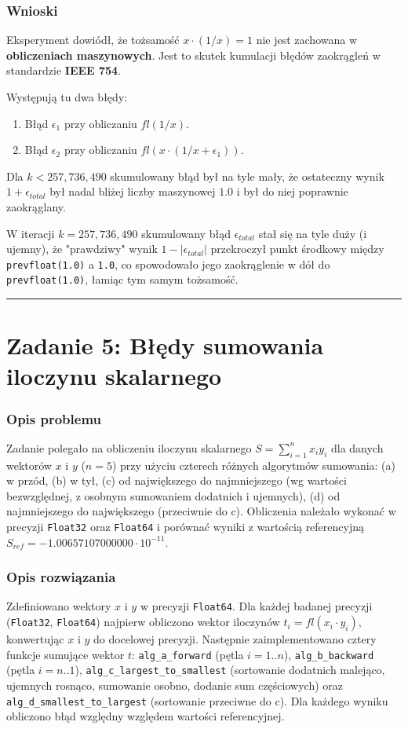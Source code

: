 \documentclass[11pt, a4paper]{article}
\newcommand{\taskseparator}{\leavevmode\leaders\hrule height 0.5pt\hfill\kern0pt}
\begin{document}
\subsubsection{Wnioski}
Eksperyment dowiódł, że tożsamość $x \cdot (1/x) = 1$ nie jest zachowana w \textbf{obliczeniach maszynowych}. Jest to skutek  kumulacji błędów zaokrągleń  w standardzie \textbf{IEEE 754}.

Występują tu dwa błędy:
\begin{enumerate}
    \item Błąd $\epsilon_1$ przy obliczaniu $fl(1/x)$.
    \item Błąd $\epsilon_2$ przy obliczaniu $fl(x \cdot (1/x + \epsilon_1))$.
\end{enumerate}
Dla $k < 257,736,490$ skumulowany błąd był na tyle mały, że ostateczny wynik $1 + \epsilon_{total}$ był nadal bliżej liczby maszynowej $1.0$ i był do niej poprawnie zaokrąglany.

W iteracji $k = 257,736,490$ skumulowany błąd $\epsilon_{total}$ stał się na tyle duży (i ujemny), że "prawdziwy" wynik $1 - |\epsilon_{total}|$ przekroczył punkt środkowy między \texttt{prevfloat(1.0)} a \texttt{1.0}, co spowodowało jego zaokrąglenie w dół do \texttt{prevfloat(1.0)}, łamiąc tym samym tożsamość.

\taskseparator

\section{Zadanie 5: Błędy sumowania iloczynu skalarnego}

\subsubsection{Opis problemu}
Zadanie polegało na obliczeniu iloczynu skalarnego $S = \sum_{i=1}^{n} x_i y_i$ dla danych wektorów $x$ i $y$ ($n=5$) przy użyciu czterech różnych algorytmów sumowania: (a) w przód, (b) w tył, (c) od największego do najmniejszego (wg wartości bezwzględnej, z osobnym sumowaniem dodatnich i ujemnych), (d) od najmniejszego do największego (przeciwnie do c). Obliczenia należało wykonać w precyzji \texttt{Float32} oraz \texttt{Float64} i porównać wyniki z wartością referencyjną $S_{ref} = -1.00657107000000 \cdot 10^{-11}$.

\subsubsection{Opis rozwiązania}
Zdefiniowano wektory $x$ i $y$ w precyzji \texttt{Float64}. Dla każdej badanej precyzji (\texttt{Float32}, \texttt{Float64}) najpierw obliczono wektor iloczynów $t_i = fl(x_i \cdot y_i)$, konwertując $x$ i $y$ do docelowej precyzji. Następnie zaimplementowano cztery funkcje sumujące wektor $t$: \texttt{alg\_a\_forward} (pętla $i=1..n$), \texttt{alg\_b\_backward} (pętla $i=n..1$), \texttt{alg\_c\_largest\_to\_smallest} (sortowanie dodatnich malejąco, ujemnych rosnąco, sumowanie osobno, dodanie sum częściowych) oraz \texttt{alg\_d\_smallest\_to\_largest} (sortowanie przeciwne do c). Dla każdego wyniku obliczono błąd względny względem wartości referencyjnej.
\end{document}

